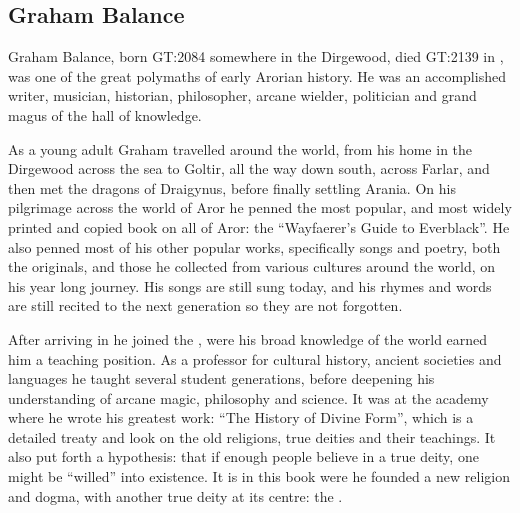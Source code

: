 \clearpage
{}
\clearpage

\subsection{Graham Balance}
\label{sec:Graham Balance}

Graham Balance, born GT:2084 somewhere in the Dirgewood, died GT:2139 in
, was one of the great polymaths of early Arorian
history. He was an accomplished writer, musician, historian, philosopher,
arcane wielder, politician and grand magus of the hall of knowledge.

As a young adult Graham travelled around the world, from his home in the
Dirgewood across the sea to Goltir, all the way down south, across Farlar, and
then met the dragons of Draigynus, before finally settling Arania. On his
pilgrimage across the world of Aror he penned the most popular, and most
widely printed and copied book on all of Aror: the ``Wayfaerer's Guide to
Everblack''. He also penned most of his other popular works, specifically songs
and poetry, both the originals, and those he collected from various cultures
around the world, on his year long journey. His songs are still sung today,
and his rhymes and words are still recited to the next generation so they are
not forgotten.

After arriving in  he joined the , were his broad knowledge of the world earned him a teaching
position. As a professor for cultural history, ancient societies and languages
he taught several student generations, before deepening his understanding of
arcane magic, philosophy and science. It was at the academy where he wrote his
greatest work: ``The History of Divine Form'', which is a detailed treaty and
look on the old religions, true deities and their teachings. It also put forth
a hypothesis: that if enough people believe in a true deity, one might be
``willed'' into existence. It is in this book were he founded a new religion
and dogma, with another true deity at its centre: the .

